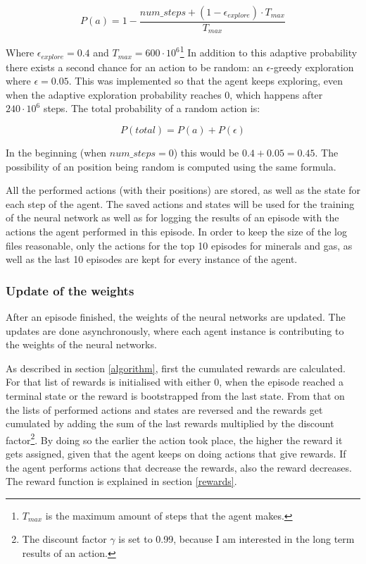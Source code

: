 \documentclass{article}
\begin{document}
\begin{equation}
P(a) = 1 - \frac{num\_steps + (1 - \epsilon_{explore}) \cdot 
T_{max}}{T_{max}}
\end{equation}

Where $\epsilon_{explore} = 0.4$ and $T_{max} = 600 \cdot 
10^6$\footnote{$T_{max}$ is the maximum amount of steps that the 
agent makes.} In addition to this adaptive probability there exists a second 
chance for an action to be random: an $\epsilon$-greedy exploration where 
$\epsilon = 0.05$. This was implemented so that the agent keeps exploring, even 
when the adaptive exploration probability reaches $0$, which happens after $240 
\cdot 10^6$ steps. The total probability of a random action is:

\begin{equation}
P(total) = P(a) + P(\epsilon)
\end{equation}

In the beginning (when $num\_steps = 0$) this would be $0.4 + 0.05 = 0.45$. The 
possibility of an position being random is computed using the same formula.

All the performed actions (with their positions) are stored, as well as the 
state for each step of the agent. The saved actions and states will be used for 
the training of the neural network as well as for logging the results of an 
episode with the actions the agent performed in this episode. In order to keep 
the size of the log files reasonable, only the actions for the top 10 episodes 
for minerals and gas, as well as the last 10 episodes are kept for every 
instance of the agent.

\subsubsection{Update of the weights}
After an episode finished, the weights of the neural networks are updated. The 
updates are done asynchronously, where each agent instance is contributing to 
the weights of the neural networks.

As described in section \ref{algorithm}, first the cumulated rewards are 
calculated. For that list of rewards is initialised with either 0, when the 
episode reached a terminal state or the reward is bootstrapped from the last 
state. From that on the lists of performed actions and states are reversed and 
the rewards get cumulated by adding the sum of the last rewards multiplied by 
the discount factor\footnote{The discount factor $\gamma$ is set to 0.99, 
because I am interested in the long term results of an action.}. By doing so 
the earlier the action took place, the higher the reward it gets assigned, 
given that the agent keeps on doing actions that give rewards. If the agent 
performs actions that decrease the rewards, also the reward decreases. The 
reward function is explained in section \ref{rewards}.
\end{document}
